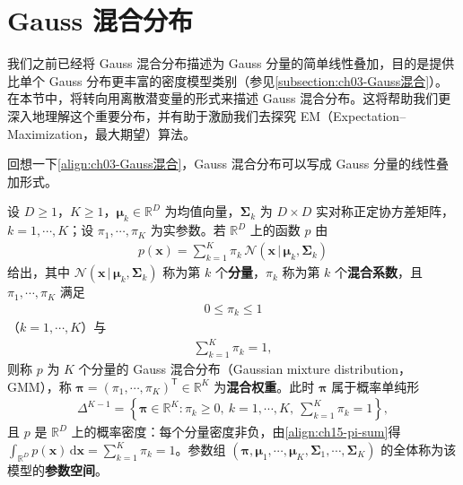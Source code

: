 \documentclass[../../main.tex]{subfiles}
\begin{document}
\section{Gauss 混合分布}\label{section:ch15-Gauss混合分布}

我们之前已经将 Gauss 混合分布描述为 Gauss 分量的简单线性叠加，目的是提供比单个 Gauss 分布更丰富的密度模型类别（参见\cref{subsection:ch03-Gauss混合}）。在本节中，将转向用离散潜变量的形式来描述 Gauss 混合分布。这将帮助我们更深入地理解这个重要分布，并有助于激励我们去探究 EM（Expectation--Maximization，最大期望）算法。

回想一下\eqref{align:ch03-Gauss混合}，Gauss 混合分布可以写成 Gauss 分量的线性叠加形式。

\begin{definition}\label{definition:ch15-Gauss混合分布}
设 $D\geqslant1$，$K\geqslant1$，$\bm{\mu}_k\in\mathbb{R}^{D}$ 为均值向量，$\bm{\Sigma}_k$ 为 $D\times D$ 实对称正定协方差矩阵，$k=1,\cdots,K$；设 $\pi_1,\cdots,\pi_K$ 为实参数。若 $\mathbb{R}^{D}$ 上的函数 $p$ 由
\begin{align}
p(\bm{x})=\sum_{k=1}^{K}\pi_k\,\mathcal{N}(\bm{x}\,|\,\bm{\mu}_k,\bm{\Sigma}_k)
\label{align:ch15-gmm-marginal}
\end{align}
给出，其中 $\mathcal{N}(\bm{x}\,|\,\bm{\mu}_k,\bm{\Sigma}_k)$ 称为第 $k$ 个\textbf{分量}，$\pi_k$ 称为第 $k$ 个\textbf{混合系数}，且 $\pi_1,\cdots,\pi_K$ 满足
\begin{align}
0\leqslant\pi_k\leqslant1
\label{align:ch15-pi-bounds}
\end{align}
（$k=1,\cdots,K$）与
\begin{align}
\sum_{k=1}^{K}\pi_k=1,
\label{align:ch15-pi-sum}
\end{align}
则称 $p$ 为 $K$ 个分量的 Gauss 混合分布（Gaussian mixture distribution，GMM），称 $\bm{\pi}=(\pi_1,\cdots,\pi_K)^{\mathsf T}\in\mathbb{R}^{K}$ 为\textbf{混合权重}。此时 $\bm{\pi}$ 属于概率单纯形
\begin{align*}
\Delta^{K-1}=\left\{\bm{\pi}\in\mathbb{R}^{K}:\pi_k\geqslant0,\ k=1,\cdots,K,\ \sum_{k=1}^{K}\pi_k=1\right\},
\end{align*}
且 $p$ 是 $\mathbb{R}^{D}$ 上的概率密度：每个分量密度非负，由\eqref{align:ch15-pi-sum}得 $\int_{\mathbb{R}^{D}}p(\bm{x})\,\mathrm{d}\bm{x}=\sum_{k=1}^{K}\pi_k=1$。参数组 $(\bm{\pi},\bm{\mu}_1,\cdots,\bm{\mu}_K,\bm{\Sigma}_1,\cdots,\bm{\Sigma}_K)$ 的全体称为该模型的\textbf{参数空间}。
\end{definition}
\end{document}
